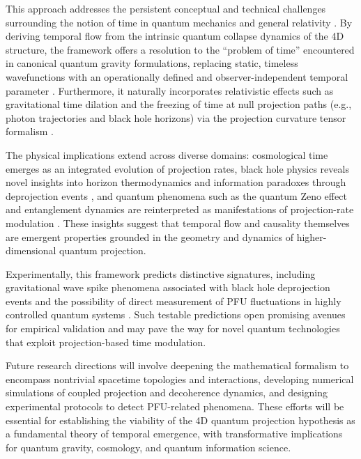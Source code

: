 \documentclass[12pt,a4paper]{article}
\numberwithin{equation}{section}
\begin{document}
This approach addresses the persistent conceptual and technical challenges surrounding the notion of time in quantum mechanics and general relativity \cite{isham_problem_1993,kuchar_time_1992}. By deriving temporal flow from the intrinsic quantum collapse dynamics of the 4D structure, the framework offers a resolution to the “problem of time” encountered in canonical quantum gravity formulations, replacing static, timeless wavefunctions with an operationally defined and observer-independent temporal parameter \cite{rovelli_quantum_2004}. Furthermore, it naturally incorporates relativistic effects such as gravitational time dilation and the freezing of time at null projection paths (e.g., photon trajectories and black hole horizons) via the projection curvature tensor formalism \cite{carroll_spacetime_2004}.

The physical implications extend across diverse domains: cosmological time emerges as an integrated evolution of projection rates, black hole physics reveals novel insights into horizon thermodynamics and information paradoxes through deprojection events \cite{hawking_particle_1975}, and quantum phenomena such as the quantum Zeno effect and entanglement dynamics are reinterpreted as manifestations of projection-rate modulation \cite{misra_zeno_1977}. These insights suggest that temporal flow and causality themselves are emergent properties grounded in the geometry and dynamics of higher-dimensional quantum projection.

Experimentally, this framework predicts distinctive signatures, including gravitational wave spike phenomena associated with black hole deprojection events and the possibility of direct measurement of PFU fluctuations in highly controlled quantum systems \cite{abbott_observation_2016}. Such testable predictions open promising avenues for empirical validation and may pave the way for novel quantum technologies that exploit projection-based time modulation.

Future research directions will involve deepening the mathematical formalism to encompass nontrivial spacetime topologies and interactions, developing numerical simulations of coupled projection and decoherence dynamics, and designing experimental protocols to detect PFU-related phenomena. These efforts will be essential for establishing the viability of the 4D quantum projection hypothesis as a fundamental theory of temporal emergence, with transformative implications for quantum gravity, cosmology, and quantum information science.
\end{document}
